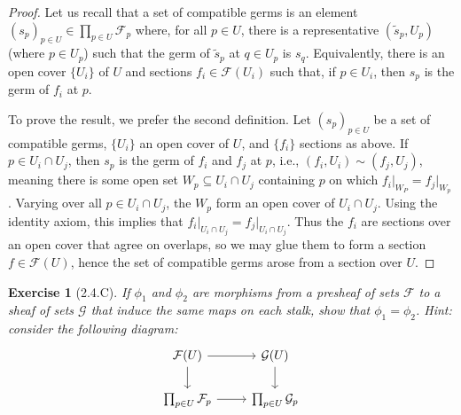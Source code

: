 \documentclass{amsart}
\newtheorem*{exercise*}{Exercise}
\begin{document}
\begin{proof}
    Let us recall that a set of compatible germs is an element $(s_p)_{p \in U} \in \prod_{p \in U}\mathcal{F}_p$ where, for all $p \in U$, there is a representative
    $(\tilde{s}_p, U_p)$ (where $p \in U_p$) such that the germ of $\tilde{s}_p$ at $q \in U_p$ is $s_q$. Equivalently, there is an open cover $\{U_i\}$ of $U$ and sections $f_i \in \mathcal{F}(U_i)$ such that, if $p \in U_i$, then $s_p$ is the germ of $f_i$ at $p$.

    To prove the result, we prefer the second definition. Let $(s_p)_{p \in U}$ be a set of compatible germs, $\{U_i\}$ an open cover of $U$, and $\{f_i\}$ sections as above.
    If $p \in U_i \cap U_j$, then $s_p$ is the germ of $f_i$ and $f_j$ at $p$, i.e., $(f_i, U_i) \sim (f_j, U_j)$, meaning there is some open set $W_p \subseteq U_i \cap U_j$ containing $p$
    on which $f_i\vert_{W_P} = f_j\vert_{W_p}$. Varying over all $p \in U_i \cap U_j$, the $W_p$ form an open cover of $U_i \cap U_j$. Using the identity axiom, this implies
    that $f_i\vert_{U_i \cap U_j} = f_j\vert_{U_i \cap U_j}$. Thus the $f_i$ are sections over an open cover that agree on overlaps, so we may glue them to form a section 
    $f \in \mathcal{F}(U)$, hence the set of compatible germs arose from a section over $U$.
    
\end{proof}

\vspace{0.1in}


\begin{exercise*}[2.4.C]
    If $\phi_1$ and $\phi_2$ are morphisms from a presheaf of sets $\mathcal{F}$ to a sheaf
    of sets $\mathcal{G}$ that induce the same maps on each stalk, show that
    $\phi_1 = \phi_2$. Hint: consider the following diagram:
    \[\begin{tikzcd}
	   {\mathcal{F}(U)} & {\mathcal{G}(U)} \\
	   {\prod_{p \in U}\mathcal{F}_p} & {\prod_{p \in U}\mathcal{G}_p}
	   \arrow[from=1-1, to=1-2]
	   \arrow[from=1-1, to=2-1]
	   \arrow[from=1-2, to=2-2]
	   \arrow[from=2-1, to=2-2]
    \end{tikzcd}\]
\end{exercise*}
\end{document}
